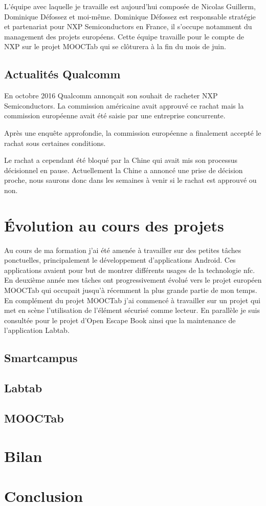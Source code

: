 \documentclass[french,12pt,a4paper,titlepage,openright,openbib]{report}
\begin{document}
L'équipe avec laquelle je travaille est aujourd'hui composée de Nicolas Guillerm, Dominique Défossez et moi-même. Dominique Défossez est responsable stratégie et partenariat pour NXP Semiconductors en France, il s'occupe notamment du management des projets européens.
Cette équipe travaille pour le compte de NXP sur le projet MOOCTab qui se clôturera à la fin du mois de juin.

\section{Actualités Qualcomm}
En octobre 2016 Qualcomm annonçait son souhait de racheter NXP Semiconductors. La commission américaine avait approuvé ce rachat mais la commission européenne avait été saisie par une entreprise concurrente.

Après une enquête approfondie, la commission européenne a finalement accepté le rachat sous certaines conditions.

Le rachat a cependant été bloqué par la Chine qui avait mis son processus décisionnel en pause. Actuellement la Chine a annoncé une prise de décision proche, nous saurons donc dans les semaines à venir si le rachat est approuvé ou non.



\chapter{Évolution au cours des projets}

Au cours de ma formation j'ai été amenée à travailler sur des petites tâches ponctuelles, principalement le développement d'applications Android. Ces applications avaient pour but de montrer différents usages de la technologie \gls{nfc}.
En deuxième année mes tâches ont progressivement évolué vers le projet européen MOOCTab qui occupait jusqu'à récemment la plus grande partie de mon temps.
En complément du projet MOOCTab j'ai commencé à travailler sur un projet qui met en scène l'utilisation de l'élément sécurisé comme lecteur.
En parallèle je suis consultée pour le projet d'Open Escape Book ainsi que la maintenance de l'application Labtab.

\section{Smartcampus}

\section{Labtab}

\section{MOOCTab}

\chapter{Bilan}

\chapter{Conclusion}

\printglossary[title={Glossaire}]

{}

	
\end{document}
